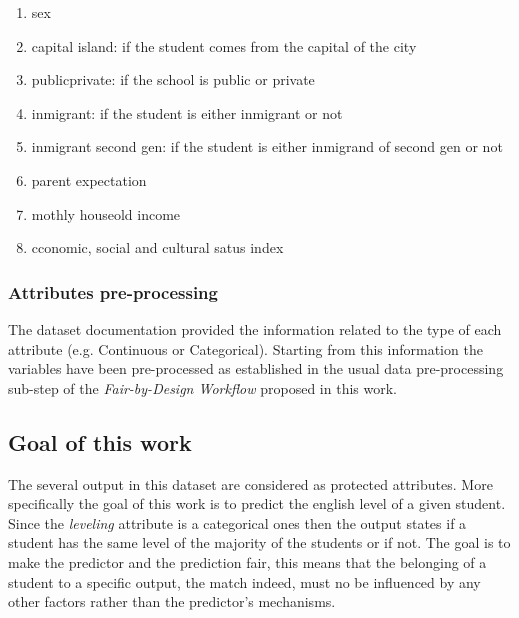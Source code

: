 \begin{enumerate}

    \item sex

    \item capital island: if the student comes from the capital of the city

    \item public\textunderscore private: if the school is public or private

    \item inmigrant: if the student is either inmigrant or not

    \item inmigrant second gen: if the student is either inmigrand of second gen or not

    \item parent expectation
    
    \item mothly houseold income

    \item cconomic, social and cultural satus index

\end{enumerate}

\subsubsection{Attributes pre-processing}

The dataset documentation provided the information related to the type of each attribute (e.g. Continuous or Categorical). Starting from this information the variables have been pre-processed as established in the usual data pre-processing sub-step of the \emph{Fair-by-Design Workflow} proposed in this work.


\subsection{Goal of this work}

The several output in this dataset are considered as protected attributes. More specifically the goal of this work is to predict the english level of a given student. Since the \emph{level\textunderscore ing} attribute is a categorical ones then the output states if a student has the same level of the majority of the students or if not. The goal is to make the predictor and the prediction fair, this means that the belonging of a student to a specific output, the match indeed, must no be influenced by any other factors rather than the predictor's mechanisms.



